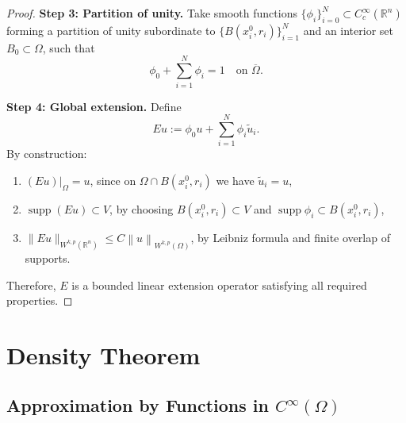 \begin{theorem}
\begin{proof}
        \medskip

        \textbf{Step 3: Partition of unity.}
        Take smooth functions $\{\phi_i\}_{i=0}^N \subset C_c^\infty(\mathbb{R}^n)$ forming a partition of unity subordinate to $\{ B(x_i^0,r_i) \}_{i=1}^N$ and an interior set $B_0 \subset \Omega$, such that
        \[
            \phi_0 + \sum_{i=1}^N \phi_i = 1 \quad \text{on } \overline{\Omega}.
        \]

        \medskip

        \textbf{Step 4: Global extension.}
        Define
        \[
            Eu := \phi_0 u + \sum_{i=1}^N \phi_i \tilde{u}_i.
        \]
        By construction:
        \begin{enumerate}[label=(\alph*)]
            \item $(Eu)|_\Omega = u$, since on $\Omega \cap B(x_i^0,r_i)$ we have $\tilde{u}_i = u$,
            \item $\operatorname{supp}(Eu) \subset V$, by choosing $B(x_i^0,r_i) \subset V$ and $\operatorname{supp} \phi_i \subset B(x_i^0,r_i)$,
            \item $\|Eu\|_{W^{k,p}(\mathbb{R}^n)} \le C \left\|u\right\|_{W^{k,p}(\Omega)}$, by Leibniz formula and finite overlap of supports.
        \end{enumerate}

        \medskip

        \noindent Therefore, $E$ is a bounded linear extension operator satisfying all required properties.
    \end{proof}
\end{theorem}



\section{Density Theorem} %
\subsection{Approximation by Functions in $C^{\infty}(\Omega)$}

